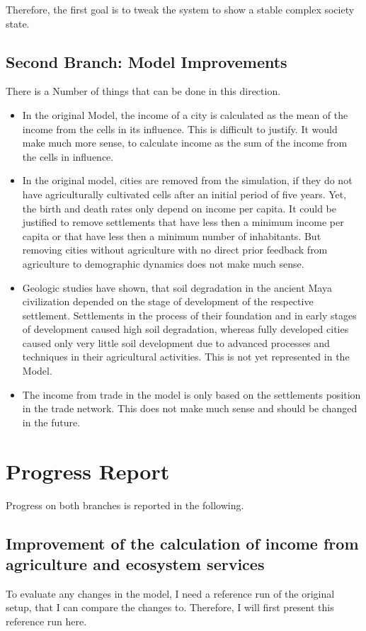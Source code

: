 Therefore, the first goal is to tweak the system to show a stable complex society state. \par 

\subsection{Second Branch: Model Improvements}
There is a Number of things that can be done in this direction.
\begin{itemize}
	\item In the original Model, the income of a city is calculated as the mean of the income from the cells in its influence. This is difficult to justify. It would make much more sense, to calculate income as the sum of the income from the cells in influence.
	\item In the original model, cities are removed from the simulation, if they do not have agriculturally cultivated cells after an initial period of five years. Yet, the birth and death rates only depend on income per capita. It could be justified to remove settlements that have less then a minimum income per capita or that have less then a minimum number of inhabitants. But removing cities without agriculture with no direct prior feedback from agriculture to demographic dynamics does not make much sense.
	\item Geologic studies have shown, that soil degradation in the ancient Maya civilization depended on the stage of development of the respective settlement. Settlements in the process of their foundation and in early stages of development caused high soil degradation, whereas fully developed cities caused only very little soil development due to advanced processes and techniques in their agricultural activities. This is not yet represented in the Model.
	\item The income from trade in the model is only based on the settlements position in the trade network. This does not make much sense and should be changed in the future.
\end{itemize}

\section{Progress Report}
Progress on both branches is reported in the following.
\subsection{Improvement of the calculation of income from agriculture and ecosystem services}
To evaluate any changes in the model, I need a reference run of the original setup, that I can compare the changes to. Therefore, I will first present this reference run here.


